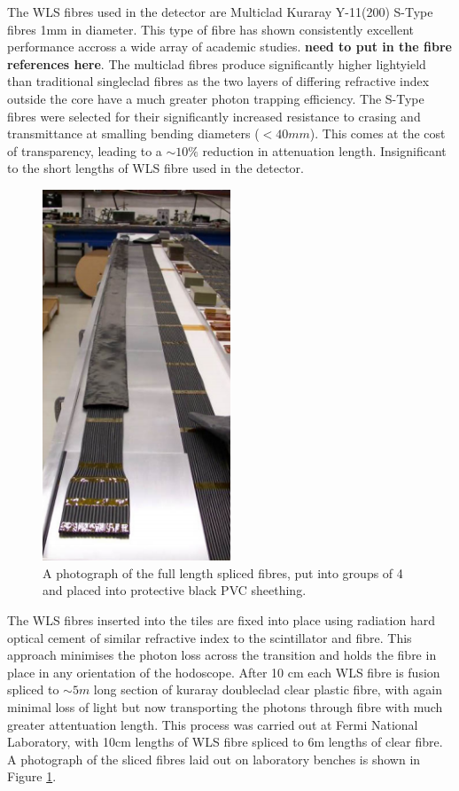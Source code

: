 The WLS fibres used in the detector are Multiclad Kuraray Y-11(200) S-Type fibres 1mm in diameter. This type of fibre has shown consistently excellent performance accross a wide array of academic studies. \textbf{need to put in the fibre references here}. The multiclad fibres produce significantly higher lightyield than traditional singleclad fibres as the two layers of differing refractive index outside the core have a much greater photon trapping efficiency. The S-Type fibres were selected for their significantly increased resistance to crasing and transmittance at smalling bending diameters ($<40mm$). This comes at the cost of transparency, leading to a $\sim 10\%$ reduction in attenuation length. Insignificant to the short lengths of WLS fibre used in the detector.

\begin{figure}
	\centering
	\includegraphics[width=0.5\textwidth]{ImgChap1/fibrelength}
	\caption{A photograph of the full length spliced fibres, put into groups of 4 and placed into protective black PVC sheething.}
	\label{Longfibres}
\end{figure}

The WLS fibres inserted into the tiles are fixed into place using radiation hard optical cement of similar refractive index to the scintillator and fibre. This approach minimises the photon loss across the transition and holds the fibre in place in any orientation of the hodoscope. After 10 cm each WLS fibre is fusion spliced to $\sim 5m $ long section of kuraray doubleclad clear plastic fibre, with again minimal loss of light but now transporting the photons through fibre with much greater attentuation length. This process was carried out at Fermi National Laboratory, with 10cm lengths of WLS fibre spliced to 6m lengths of clear fibre. A photograph of the sliced fibres laid out on laboratory benches is shown in Figure \ref{Longfibres}. 
  
